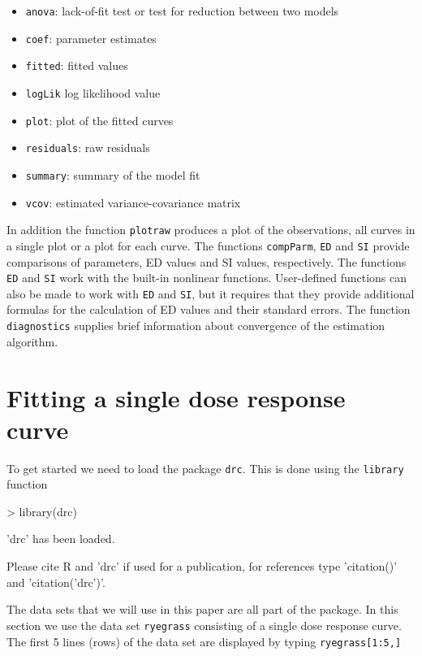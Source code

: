\documentclass[a4paper]{article}
\begin{document}
\begin{itemize}
\item \verb+anova+: lack-of-fit test or test for reduction between two models
\item \verb+coef+: parameter estimates
\item \verb+fitted+: fitted values
\item \verb+logLik+ log likelihood value
\item \verb+plot+: plot of the fitted curves
\item \verb+residuals+: raw residuals
\item \verb+summary+: summary of the model fit
\item \verb+vcov+: estimated variance-covariance matrix
\end{itemize} 

In addition the function \verb+plotraw+ produces a plot of the observations, all curves in a single plot or a plot for each curve.
The functions \verb+compParm+, \verb+ED+ and \verb+SI+ provide comparisons of parameters, ED values and SI values, respectively. 
The functions \verb+ED+ and \verb+SI+ work with the built-in nonlinear functions. User-defined functions can also be made to work with \verb+ED+ 
and \verb+SI+, but it requires that they provide additional formulas for the calculation of ED values and their standard errors.
The function \verb+diagnostics+ supplies brief information about convergence of the estimation algorithm.




\newpage
\section{Fitting a single dose response curve} \label{sec:4}

To get started we need to load the package \verb+drc+. This is done using the \verb+library+ function

\begin{Schunk}
\begin{Sinput}
> library(drc)
\end{Sinput}
\begin{Soutput}
'drc' has been loaded.

Please cite R and 'drc' if used for a publication,
for references type 'citation()' and 'citation('drc')'.
\end{Soutput}
\end{Schunk}
The data sets that we will use in this paper are all part of the package. In this section we use the data set 
\verb+ryegrass+ consisting of a single dose response curve. The first 5 lines (rows) of the data set are 
displayed by typing \verb+ryegrass[1:5,]+
\end{document}
